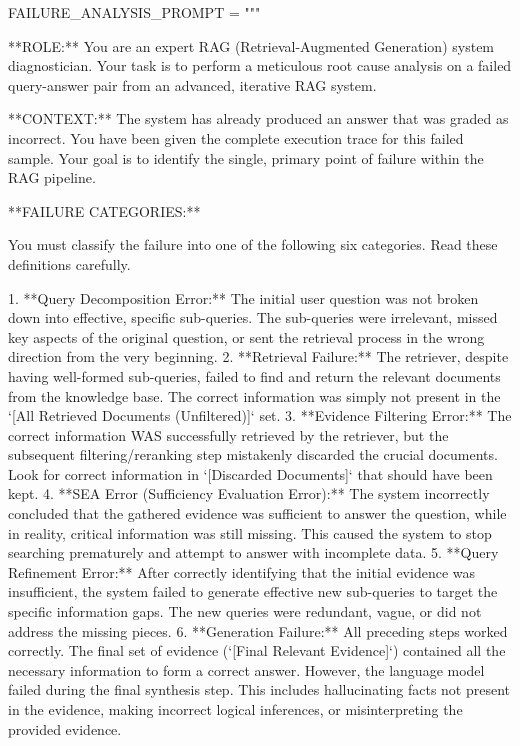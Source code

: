 \documentclass[11pt]{article}
\begin{document}
\begin{PromptBlock}
FAILURE_ANALYSIS_PROMPT = """

**ROLE:** You are an expert RAG (Retrieval-Augmented Generation) system diagnostician. Your task is to perform a meticulous root cause analysis on a failed query-answer pair from an advanced, iterative RAG system.

**CONTEXT:** The system has already produced an answer that was graded as incorrect. You have been given the complete execution trace for this failed sample. Your goal is to identify the single, primary point of failure within the RAG pipeline.

**FAILURE CATEGORIES:**

You must classify the failure into one of the following six categories. Read these definitions carefully.

1.  **Query Decomposition Error:** The initial user question was not broken down into effective, specific sub-queries. The sub-queries were irrelevant, missed key aspects of the original question, or sent the retrieval process in the wrong direction from the very beginning.
2.  **Retrieval Failure:** The retriever, despite having well-formed sub-queries, failed to find and return the relevant documents from the knowledge base. The correct information was simply not present in the `[All Retrieved Documents (Unfiltered)]` set.
3.  **Evidence Filtering Error:** The correct information WAS successfully retrieved by the retriever, but the subsequent filtering/reranking step mistakenly discarded the crucial documents. Look for correct information in `[Discarded Documents]` that should have been kept.
4.  **SEA Error (Sufficiency Evaluation Error):** The system incorrectly concluded that the gathered evidence was sufficient to answer the question, while in reality, critical information was still missing. This caused the system to stop searching prematurely and attempt to answer with incomplete data.
5.  **Query Refinement Error:** After correctly identifying that the initial evidence was insufficient, the system failed to generate effective new sub-queries to target the specific information gaps. The new queries were redundant, vague, or did not address the missing pieces.
6.  **Generation Failure:** All preceding steps worked correctly. The final set of evidence (`[Final Relevant Evidence]`) contained all the necessary information to form a correct answer. However, the language model failed during the final synthesis step. This includes hallucinating facts not present in the evidence, making incorrect logical inferences, or misinterpreting the provided evidence.


\end{PromptBlock}
\end{document}
